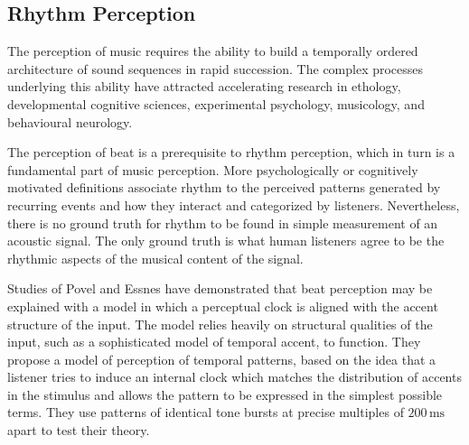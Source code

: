 \documentclass{scrartcl}
\begin{document}





\subsection{Rhythm Perception}

The perception of music requires the ability to build a temporally ordered architecture of sound sequences in rapid succession. The complex processes underlying this ability have attracted accelerating research in ethology, developmental cognitive sciences, experimental psychology, musicology, and behavioural neurology.

The perception of beat is a prerequisite to rhythm perception, which in turn is a fundamental part of music perception. More psychologically or cognitively motivated definitions associate rhythm to the perceived patterns generated by recurring events and how they interact and categorized by listeners. Nevertheless, there is no ground truth for rhythm to be found in simple measurement of an acoustic signal. The only ground truth is what human listeners agree to be the rhythmic aspects of the musical content of the signal.

Studies of Povel and Essnes \cite{Povel1985} have demonstrated that beat perception may be explained with a model in which a perceptual clock is aligned with the accent structure of the input. The model relies heavily on structural qualities of the input, such as a sophisticated model of temporal accent, to function. They propose a model of perception of temporal patterns, based on the idea that a listener tries to induce an internal clock which matches the distribution of accents in the stimulus and allows the pattern to be expressed in the simplest possible terms. They use patterns of identical tone bursts at precise multiples of $200\, \text{ms}$ apart to test their theory. 
\end{document}
